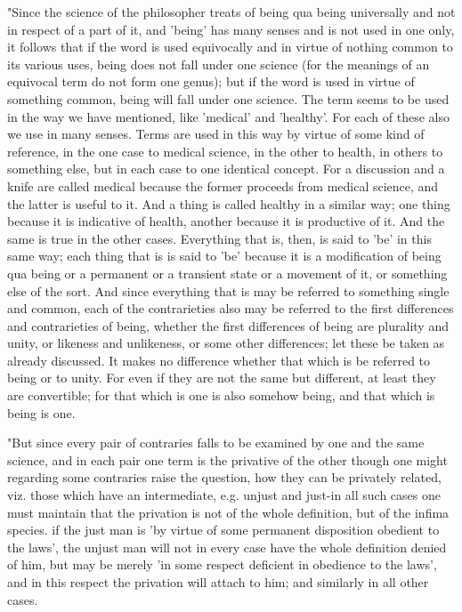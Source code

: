 "Since the science of the philosopher treats of being qua being universally
and not in respect of a part of it, and 'being' has many senses and
is not used in one only, it follows that if the word is used equivocally
and in virtue of nothing common to its various uses, being does not
fall under one science (for the meanings of an equivocal term do not
form one genus); but if the word is used in virtue of something common,
being will fall under one science. The term seems to be used in the
way we have mentioned, like 'medical' and 'healthy'. For each of these
also we use in many senses. Terms are used in this way by virtue of
some kind of reference, in the one case to medical science, in the
other to health, in others to something else, but in each case to
one identical concept. For a discussion and a knife are called medical
because the former proceeds from medical science, and the latter is
useful to it. And a thing is called healthy in a similar way; one
thing because it is indicative of health, another because it is productive
of it. And the same is true in the other cases. Everything that is,
then, is said to 'be' in this same way; each thing that is is said
to 'be' because it is a modification of being qua being or a permanent
or a transient state or a movement of it, or something else of the
sort. And since everything that is may be referred to something single
and common, each of the contrarieties also may be referred to the
first differences and contrarieties of being, whether the first differences
of being are plurality and unity, or likeness and unlikeness, or some
other differences; let these be taken as already discussed. It makes
no difference whether that which is be referred to being or to unity.
For even if they are not the same but different, at least they are
convertible; for that which is one is also somehow being, and that
which is being is one. 

"But since every pair of contraries falls to be examined by one and
the same science, and in each pair one term is the privative of the
other though one might regarding some contraries raise the question,
how they can be privately related, viz. those which have an intermediate,
e.g. unjust and just-in all such cases one must maintain that the
privation is not of the whole definition, but of the infima species.
if the just man is 'by virtue of some permanent disposition obedient
to the laws', the unjust man will not in every case have the whole
definition denied of him, but may be merely 'in some respect deficient
in obedience to the laws', and in this respect the privation will
attach to him; and similarly in all other cases. 

